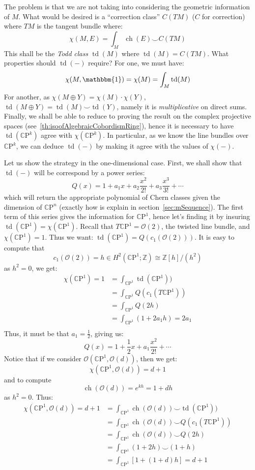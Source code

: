 \documentclass{book}
\newcommand{\Z}{{\mathbb{Z}}}
\newcommand{\CO}{{\mathcal{O}}}
\newcommand{\CP}{{\mathbb{C}\mathrm{P}}}
\newcommand{\ch}{{\operatorname{ch}}}
\newcommand{\td}{{\operatorname{td}}}
\renewcommand{\ch}{{\operatorname{ch}}}
\begin{document}
The problem is that we are not taking into considering the geometric information of $M$. What would be desired
is a ``correction class'' $C(TM)$ ($C$ for correction) where $TM$ is the tangent bundle where:
\[
  \chi(M, E) = \int_M \ch(E) \smile C(TM)
\]
This shall be the \emph{Todd class} $\td(M)$ where $\td(M) = C(TM)$. What properties should $\td(-)$ require? For one, we must have:
\[
  \chi(M, \mathbbm{1}) = \chi(M) = \int_M \td(M)
\]
For another, as $\chi(M\oplus Y) = \chi(M)\cdot \chi(Y)$, $\td(M\oplus Y) = \td(M)\smile \td(Y)$, namely it is
\emph{multiplicative} on direct sums. Finally, we shall be able to reduce to proving the result  on the complex
projective spaces (see~\cref{th:isoofAlgebraicCobordismRing}), hence
it is necessary to have $\td(\CP^k)$ agree with $\chi(\CP^k)$. In particular, as we know the line bundles over
$\CP^k$, we can deduce $\td(-)$ by making it agree with the values of $\chi(-)$.

Let us show the strategy in the one-dimensional case. First, we shall show that
$\td(-)$ will be correspond by a power series:
\[
  Q(x) = 1 + a_1x + a_2\frac{x^2}{2!} + a_3 \frac{x^3}{3!} +  \cdots
\]
which will return the appropriate polynomial of Chern classes given the dimension of $\CP^n$ (exactly how is explain
in section~\ref{sec:mSequence}). The first term of this series gives the information for $\CP^1$, hence let's
finding it by insuring $\td(\CP^1) = \chi(\CP^1)$. Recall that $T\CP^1 = \CO(2)$, the twisted line bundle, and
$\chi(\CP^1) = 1$. Thus we want: $\td(\CP^1) = Q\left(c_1(\CO(2))\right)$. It is easy to compute that
\[
  c_1(\CO(2)) = h \in H^2(\CP^1; \Z) \cong \Z[h]/(h^2)
\]
as $h^2 = 0$, we get:
\begin{align*}
  \chi(\CP^1) = 1 &= \int_{\CP^1} \td(\CP^1))\\
  &= \int_{\CP^1} Q(c_1(T\CP^1))\\
  &= \int_{\CP^1} Q(2h)\\
  &= \int_{\CP^1} (1 + 2a_1h) = 2a_1\\
\end{align*}
Thus, it must be that $a_1 = \frac{1}{2}$, giving us:
\[
  Q(x) = 1 + \frac{1}{2}x + a_1 \frac{x^2}{2!} + \cdots
\]
Notice that if we consider $\CO(\CP^1, \CO(d))$, then we get:
\[
  \chi(\CP^1, \CO(d)) = d+1
\]
and to compute
\[
  \ch(\CO(d)) = e^{kh} = 1 + dh
\]
as $h^2 = 0$. Thus:
\begin{align*}
  \chi(\CP^1, \CO(d)) = d+1 &= \int_{\CP^1} \ch(\CO(d)) \smile \td(\CP^1))\\
  &= \int_{\CP^1} \ch(\CO(d)) \smile Q(c_1(T\CP^1))\\
  &= \int_{\CP^1} \ch(\CO(d)) \smile Q(2h)\\
  &= \int_{\CP^1} (1+2h) \smile (1 + h)\\
  &= \int_{\CP^1} [1 + (1 + d)h] = d+1
\end{align*}
\end{document}
